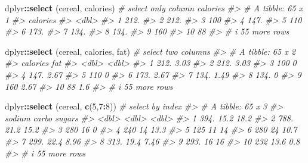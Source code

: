 \documentclass[
]{book}
\newenvironment{Shaded}{\begin{snugshade}}{\end{snugshade}}
\newcommand{\CommentTok}[1]{\textcolor[rgb]{0.56,0.35,0.01}{\textit{#1}}}
\newcommand{\DecValTok}[1]{\textcolor[rgb]{0.00,0.00,0.81}{#1}}
\newcommand{\FunctionTok}[1]{\textcolor[rgb]{0.13,0.29,0.53}{\textbf{#1}}}
\newcommand{\NormalTok}[1]{#1}
\newcommand{\SpecialCharTok}[1]{\textcolor[rgb]{0.81,0.36,0.00}{\textbf{#1}}}
\begin{document}
\begin{Shaded}
\begin{Highlighting}[]
\NormalTok{dplyr}\SpecialCharTok{::}\FunctionTok{select}\NormalTok{ (cereal, calories)        }\CommentTok{\# select only column calories}
\CommentTok{\#\textgreater{} \# A tibble: 65 x 1}
\CommentTok{\#\textgreater{}    calories}
\CommentTok{\#\textgreater{}       \textless{}dbl\textgreater{}}
\CommentTok{\#\textgreater{}  1     212.}
\CommentTok{\#\textgreater{}  2     212.}
\CommentTok{\#\textgreater{}  3     100 }
\CommentTok{\#\textgreater{}  4     147.}
\CommentTok{\#\textgreater{}  5     110 }
\CommentTok{\#\textgreater{}  6     173.}
\CommentTok{\#\textgreater{}  7     134.}
\CommentTok{\#\textgreater{}  8     134.}
\CommentTok{\#\textgreater{}  9     160 }
\CommentTok{\#\textgreater{} 10      88 }
\CommentTok{\#\textgreater{} \# i 55 more rows}

\NormalTok{dplyr}\SpecialCharTok{::}\FunctionTok{select}\NormalTok{ (cereal, calories, fat)   }\CommentTok{\# select two columns}
\CommentTok{\#\textgreater{} \# A tibble: 65 x 2}
\CommentTok{\#\textgreater{}    calories   fat}
\CommentTok{\#\textgreater{}       \textless{}dbl\textgreater{} \textless{}dbl\textgreater{}}
\CommentTok{\#\textgreater{}  1     212.  3.03}
\CommentTok{\#\textgreater{}  2     212.  3.03}
\CommentTok{\#\textgreater{}  3     100   0   }
\CommentTok{\#\textgreater{}  4     147.  2.67}
\CommentTok{\#\textgreater{}  5     110   0   }
\CommentTok{\#\textgreater{}  6     173.  2.67}
\CommentTok{\#\textgreater{}  7     134.  1.49}
\CommentTok{\#\textgreater{}  8     134.  0   }
\CommentTok{\#\textgreater{}  9     160   2.67}
\CommentTok{\#\textgreater{} 10      88   1.6 }
\CommentTok{\#\textgreater{} \# i 55 more rows}

\NormalTok{dplyr}\SpecialCharTok{::}\FunctionTok{select}\NormalTok{ (cereal, }\FunctionTok{c}\NormalTok{(}\DecValTok{5}\NormalTok{,}\DecValTok{7}\SpecialCharTok{:}\DecValTok{8}\NormalTok{))        }\CommentTok{\# select by index}
\CommentTok{\#\textgreater{} \# A tibble: 65 x 3}
\CommentTok{\#\textgreater{}    sodium carbo sugars}
\CommentTok{\#\textgreater{}     \textless{}dbl\textgreater{} \textless{}dbl\textgreater{}  \textless{}dbl\textgreater{}}
\CommentTok{\#\textgreater{}  1   394.  15.2  18.2 }
\CommentTok{\#\textgreater{}  2   788.  21.2  15.2 }
\CommentTok{\#\textgreater{}  3   280   16     0   }
\CommentTok{\#\textgreater{}  4   240   14    13.3 }
\CommentTok{\#\textgreater{}  5   125   11    14   }
\CommentTok{\#\textgreater{}  6   280   24    10.7 }
\CommentTok{\#\textgreater{}  7   299.  22.4   8.96}
\CommentTok{\#\textgreater{}  8   313.  19.4   7.46}
\CommentTok{\#\textgreater{}  9   293.  16    16   }
\CommentTok{\#\textgreater{} 10   232   13.6   0.8 }
\CommentTok{\#\textgreater{} \# i 55 more rows}


\end{Highlighting}
\end{Shaded}
\end{document}
